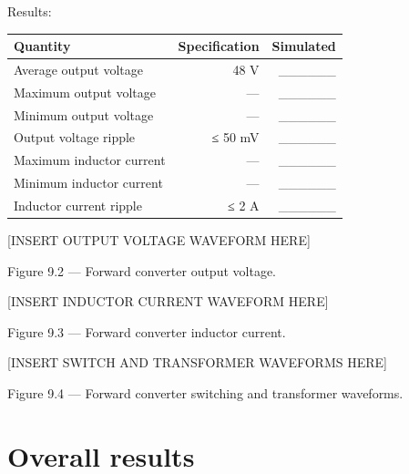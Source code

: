 \documentclass[
  paper=a4,
  oneside  ,captions=tableheading
]{scrartcl}
\newcounter{none}
\begin{document}
Results:

{\def\LTcaptype{none} %
\begin{longtable}[]{@{}lrr@{}}
\toprule\noalign{}
Quantity & Specification & Simulated \\
\midrule\noalign{}
\endhead
\bottomrule\noalign{}
\endlastfoot
Average output voltage & 48 V & \_\_\_\_\_\_ \\
Maximum output voltage & --- & \_\_\_\_\_\_ \\
Minimum output voltage & --- & \_\_\_\_\_\_ \\
Output voltage ripple & ≤ 50 mV & \_\_\_\_\_\_ \\
Maximum inductor current & --- & \_\_\_\_\_\_ \\
Minimum inductor current & --- & \_\_\_\_\_\_ \\
Inductor current ripple & ≤ 2 A & \_\_\_\_\_\_ \\
\end{longtable}
}

{[}INSERT OUTPUT VOLTAGE WAVEFORM HERE{]}

Figure 9.2 --- Forward converter output voltage.

{[}INSERT INDUCTOR CURRENT WAVEFORM HERE{]}

Figure 9.3 --- Forward converter inductor current.

{[}INSERT SWITCH AND TRANSFORMER WAVEFORMS HERE{]}

Figure 9.4 --- Forward converter switching and transformer waveforms.

\section{Overall results}\label{overall-results}
\end{document}
